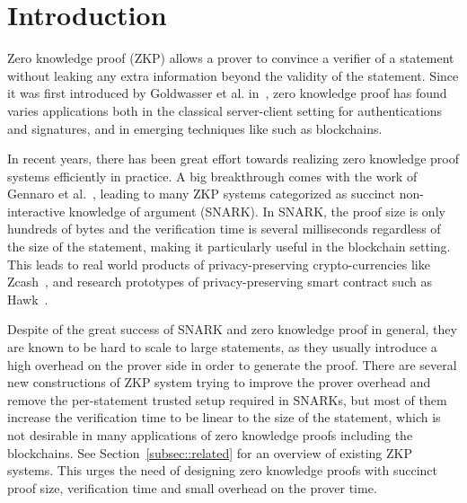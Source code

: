 \section{Introduction}\label{sec:intro}


Zero knowledge proof (ZKP) allows a prover to convince a verifier of a statement without leaking any extra information beyond the validity of the statement. Since it was first introduced by Goldwasser et al. in~\cite{goldwasser1989knowledge}, zero knowledge proof has found varies applications both in the classical server-client setting for authentications and signatures, and in emerging techniques like such as blockchains.

In recent years, there has been great effort towards realizing zero knowledge proof systems efficiently in practice. A big breakthrough comes with the work of Gennaro et al.~\cite{GGPR13}, leading to many ZKP systems categorized as succinct non-interactive knowledge of argument (SNARK). In SNARK, the proof size is only hundreds of bytes and the verification time is several milliseconds regardless of the size of the statement, making it particularly useful in the blockchain setting. This leads to real world products of privacy-preserving crypto-currencies like Zcash~\cite{zerocash}, and research prototypes of privacy-preserving smart contract such as Hawk~\cite{kosba2016hawk}.

Despite of the great success of SNARK and zero knowledge proof in general, they are known to be hard to scale to large statements, as they usually introduce a high overhead on the prover side in order to generate the proof. There are several new constructions of ZKP system trying to improve the prover overhead and remove the per-statement trusted setup required in SNARKs, but most of them increase the verification time to be linear to the size of the statement, which is not desirable in many applications of zero knowledge proofs including the blockchains. See Section~\ref{subsec::related} for an overview of existing ZKP systems. This urges the need of designing zero knowledge proofs with succinct proof size, verification time and small overhead on the prover time.



